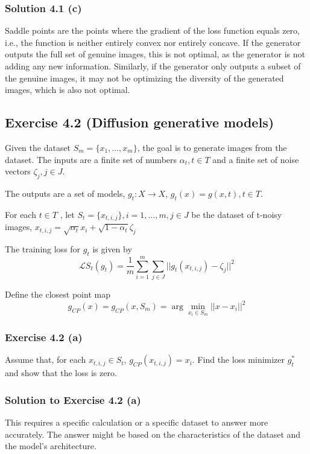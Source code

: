 \documentclass[
10pt, %
a4paper, %
oneside, %
headinclude,footinclude, %
BCOR5mm, %
]{scrartcl}
\begin{document}
\subsubsection*{Solution 4.1 (c)}
Saddle points are the points where the gradient of the loss function equals zero, i.e., the function is neither entirely convex nor entirely concave. If the generator outputs the full set of genuine images, this is not optimal, as the generator is not adding any new information. Similarly, if the generator only outputs a subset of the genuine images, it may not be optimizing the diversity of the generated images, which is also not optimal.

\subsection*{Exercise 4.2 (Diffusion generative models)}
Given the dataset $S_m = \{x_1 , \ldots , x_m \}$, the goal is to generate images from the dataset. The inputs are a finite set of numbers $\alpha_t , t \in T$ and a finite set of noise vectors $\zeta_j , j \in J$.

The outputs are a set of models, $g_t : X \rightarrow X$, $g_t (x) = g(x, t), t \in T$.

For each $t \in T$ , let $S_t = \{x_{t,i,j}\}, i = 1, \ldots , m, j \in J$ be the dataset of t-noisy images, $x_{t,i,j} = \sqrt{\alpha_t} x_i + \sqrt{1 - \alpha_t} \zeta_j$

The training loss for $g_t$ is given by
\begin{equation*}
\mathcal{L} S_t (g_t ) = \frac{1}{m} \sum_{i=1}^{m} \sum_{j \in J} ||g_t (x_{t,i,j} ) - \zeta_j ||^2
\end{equation*}

Define the closest point map
\begin{equation*}
g_{CP}(x) = g_{CP} (x, S_m ) = \arg \min_{x_i \in S_m} ||x - x_i ||^2
\end{equation*}

\subsubsection*{Exercise 4.2 (a)}
Assume that, for each $x_{t,i,j} \in S_t$, $g_{CP}(x_{t,i,j}) = x_i$. Find the loss minimizer $g^*_t$ and show that the loss is zero.

\subsubsection*{Solution to Exercise 4.2 (a)}
This requires a specific calculation or a specific dataset to answer more accurately. The answer might be based on the characteristics of the dataset and the model's architecture.
\end{document}
